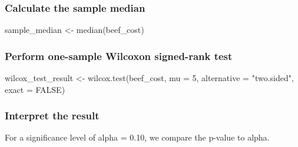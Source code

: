 \documentclass[
]{article}
\newenvironment{Shaded}{\begin{snugshade}}{\end{snugshade}}
\newcommand{\AttributeTok}[1]{\textcolor[rgb]{0.77,0.63,0.00}{#1}}
\newcommand{\ConstantTok}[1]{\textcolor[rgb]{0.00,0.00,0.00}{#1}}
\newcommand{\ControlFlowTok}[1]{\textcolor[rgb]{0.13,0.29,0.53}{\textbf{#1}}}
\newcommand{\DecValTok}[1]{\textcolor[rgb]{0.00,0.00,0.81}{#1}}
\newcommand{\FloatTok}[1]{\textcolor[rgb]{0.00,0.00,0.81}{#1}}
\newcommand{\FunctionTok}[1]{\textcolor[rgb]{0.00,0.00,0.00}{#1}}
\newcommand{\NormalTok}[1]{#1}
\newcommand{\OtherTok}[1]{\textcolor[rgb]{0.56,0.35,0.01}{#1}}
\newcommand{\SpecialCharTok}[1]{\textcolor[rgb]{0.00,0.00,0.00}{#1}}
\newcommand{\StringTok}[1]{\textcolor[rgb]{0.31,0.60,0.02}{#1}}
\begin{document}
\hypertarget{calculate-the-sample-median}{%
\subsubsection{Calculate the sample
median}\label{calculate-the-sample-median}}

\begin{Shaded}
\begin{Highlighting}[]
\NormalTok{sample\_median }\OtherTok{\textless{}{-}} \FunctionTok{median}\NormalTok{(beef\_cost)}
\end{Highlighting}
\end{Shaded}

\hypertarget{perform-one-sample-wilcoxon-signed-rank-test}{%
\subsubsection{Perform one-sample Wilcoxon signed-rank
test}\label{perform-one-sample-wilcoxon-signed-rank-test}}

\begin{Shaded}
\begin{Highlighting}[]
\NormalTok{wilcox\_test\_result }\OtherTok{\textless{}{-}} \FunctionTok{wilcox.test}\NormalTok{(beef\_cost, }\AttributeTok{mu =} \DecValTok{5}\NormalTok{, }\AttributeTok{alternative =} \StringTok{"two.sided"}\NormalTok{, }\AttributeTok{exact =} \ConstantTok{FALSE}\NormalTok{)}
\end{Highlighting}
\end{Shaded}

\hypertarget{interpret-the-result}{%
\subsubsection{Interpret the result}\label{interpret-the-result}}

For a significance level of alpha = 0.10, we compare the p-value to
alpha.

\begin{Shaded}
\end{Shaded}
\end{document}
